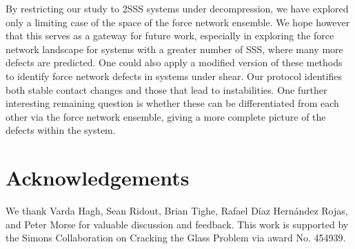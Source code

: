 By restricting our study to 2SSS systems under decompression, we have explored only a limiting case of the space of the force network ensemble. 
We hope however that this serves as a gateway for future work, especially in exploring the force network landscape for systems with a greater number of SSS, where many more defects are predicted. One could also apply a modified version of these methods to identify force network defects in systems under shear.
Our protocol identifies both stable contact changes and those that lead to instabilities. One further interesting remaining question is whether these can be differentiated from each other via the force network ensemble, giving a more complete picture of the defects within the system.

\section{Acknowledgements}
We thank Varda Hagh, Sean Ridout, Brian Tighe, Rafael D\'iaz Hern\'andez Rojas, and Peter Morse for valuable discussion and feedback. This work is supported by the Simons Collaboration on Cracking the Glass Problem via award No. 454939.
